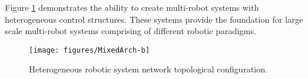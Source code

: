     Figure \ref{fig:hetero_conf} demonstrates the ability to create multi-robot
      systems with heterogeneous control structures.
    These systems provide the foundation for large scale multi-robot systems
      comprising of different robotic paradigms.
    \begin{figure}%
    \begin{center}
      \texttt{[image: figures/MixedArch-b]}
      \label{fig:mixedsystem}
    \end{center}
    \caption{Heterogeneous robotic system network topological configuration.}
    \label{fig:hetero_conf}
    \end{figure}

